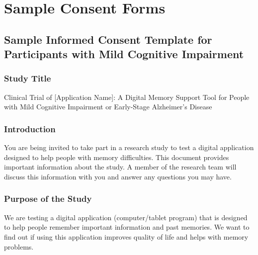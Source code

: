 \chapter{Sample Consent Forms}

\section{Sample Informed Consent Template for Participants with Mild Cognitive Impairment}

\subsection{Study Title}
Clinical Trial of [Application Name]: A Digital Memory Support Tool for People with Mild Cognitive Impairment or Early-Stage Alzheimer's Disease

\subsection{Introduction}
You are being invited to take part in a research study to test a digital application designed to help people with memory difficulties. This document provides important information about the study. A member of the research team will discuss this information with you and answer any questions you may have.

\subsection{Purpose of the Study}
We are testing a digital application (computer/tablet program) that is designed to help people remember important information and past memories. We want to find out if using this application improves quality of life and helps with memory problems.

